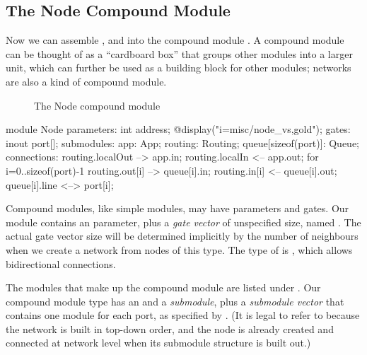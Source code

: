 \subsection{The Node Compound Module}
\label{sec:warmup:ned-lang:node-compound-module}

Now we can assemble ,  and  into the
compound module . A compound module can be thought of as
a ``cardboard box'' that groups other modules into a larger unit,
which can further be used as a building block for other modules;
networks are also a kind of compound module.

\begin{figure}[htbp]
  \begin{center}
    \caption{The Node compound module}
    \label{fig:ned-routing-node}
  \end{center}
\end{figure}

\begin{ned}
module Node
{
    parameters:
        int address;
        @display("i=misc/node_vs,gold");
    gates:
        inout port[];
    submodules:
        app: App;
        routing: Routing;
        queue[sizeof(port)]: Queue;
    connections:
        routing.localOut --> app.in;
        routing.localIn <-- app.out;
        for i=0..sizeof(port)-1 {
            routing.out[i] --> queue[i].in;
            routing.in[i] <-- queue[i].out;
            queue[i].line <--> port[i];
        }
}
\end{ned}

Compound modules, like simple modules, may have parameters and gates.
Our  module contains an  parameter, plus a
\textit{gate vector} of unspecified size, named .
The actual gate vector size will be determined implicitly by the number
of neighbours when we create a network from nodes of this type.
The type of  is , which allows bidirectional
connections.

The modules that make up the compound module are listed under
. Our  compound module type has an  and
a  \textit{submodule}, plus a  \textit{submodule
vector} that contains one  module for each port, as specified by
. (It is legal to refer to  because
the network is built in top-down order, and the node is already created and
connected at network level when its submodule structure is built out.)

